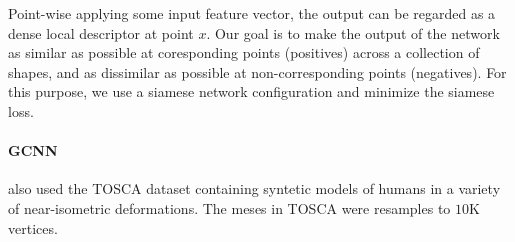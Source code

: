 \documentclass[pdftex,10pt,a4paper]{scrartcl}
\begin{document}
Point-wise applying some input feature vector, the output can be regarded as a dense local descriptor at point $x$.
Our goal is to make the output of the network as similar as possible at coresponding points (positives) across a collection of shapes, and as dissimilar as possible at non-corresponding points (negatives).
For this purpose, we use a siamese network configuration and minimize the siamese loss.

\paragraph{GCNN}

also used the TOSCA dataset containing syntetic models of humans in a variety of near-isometric deformations.
The meses in TOSCA were resamples to $10$K vertices.



\end{document}
